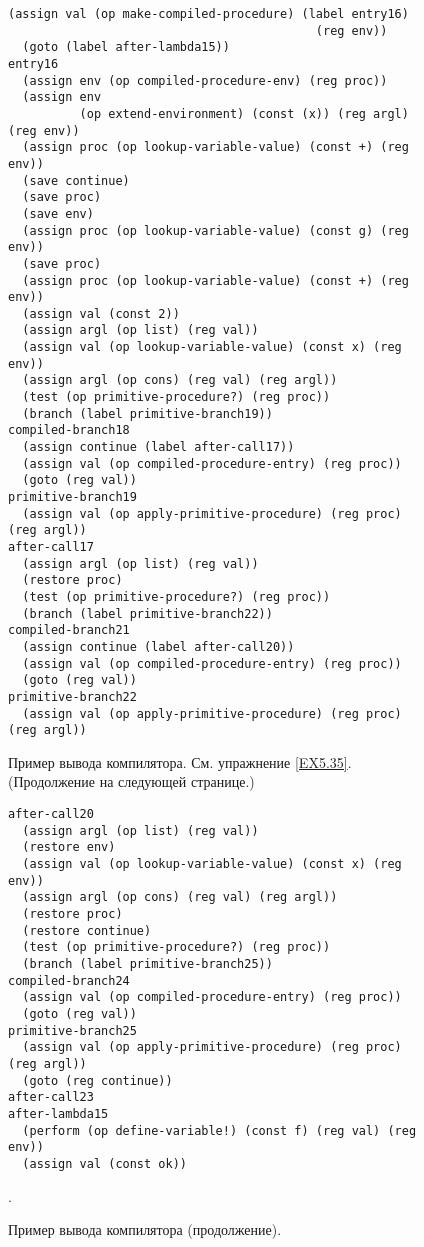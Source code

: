 \begin{figure}[hp]
\begin{Verbatim}[fontsize=\small]
  (assign val (op make-compiled-procedure) (label entry16)
                                           (reg env))
  (goto (label after-lambda15))
entry16
  (assign env (op compiled-procedure-env) (reg proc))
  (assign env
          (op extend-environment) (const (x)) (reg argl) (reg env))
  (assign proc (op lookup-variable-value) (const +) (reg env))
  (save continue)
  (save proc)
  (save env)
  (assign proc (op lookup-variable-value) (const g) (reg env))
  (save proc)
  (assign proc (op lookup-variable-value) (const +) (reg env))
  (assign val (const 2))
  (assign argl (op list) (reg val))
  (assign val (op lookup-variable-value) (const x) (reg env))
  (assign argl (op cons) (reg val) (reg argl))
  (test (op primitive-procedure?) (reg proc))
  (branch (label primitive-branch19))
compiled-branch18
  (assign continue (label after-call17))
  (assign val (op compiled-procedure-entry) (reg proc))
  (goto (reg val))
primitive-branch19
  (assign val (op apply-primitive-procedure) (reg proc) (reg argl))
after-call17
  (assign argl (op list) (reg val))
  (restore proc)
  (test (op primitive-procedure?) (reg proc))
  (branch (label primitive-branch22))
compiled-branch21
  (assign continue (label after-call20))
  (assign val (op compiled-procedure-entry) (reg proc))
  (goto (reg val))
primitive-branch22
  (assign val (op apply-primitive-procedure) (reg proc) (reg argl))
\end{Verbatim}
\caption{Пример вывода компилятора. См. упражнение \ref{EX5.35}. (Продолжение 
на следующей странице.)}
\end{figure} 
\pagebreak
\addtocounter{figure}{-1}
\begin{figure}[ht]
\begin{Verbatim}[fontsize=\small]
after-call20
  (assign argl (op list) (reg val))
  (restore env)
  (assign val (op lookup-variable-value) (const x) (reg env))
  (assign argl (op cons) (reg val) (reg argl))
  (restore proc)
  (restore continue)
  (test (op primitive-procedure?) (reg proc))
  (branch (label primitive-branch25))
compiled-branch24
  (assign val (op compiled-procedure-entry) (reg proc))
  (goto (reg val))
primitive-branch25
  (assign val (op apply-primitive-procedure) (reg proc) (reg argl))
  (goto (reg continue))
after-call23
after-lambda15
  (perform (op define-variable!) (const f) (reg val) (reg env))
  (assign val (const ok))
\end{Verbatim}
\caption{Пример вывода компилятора (продолжение).}.
\label{P5.18} %
\end{figure}

